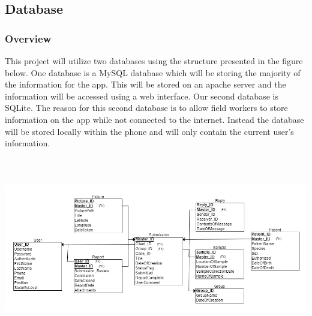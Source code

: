 \documentclass[onecolumn, draftclsnofoot,10pt, compsoc]{IEEEtran}
\begin{document}
\subsection{Database}
\subsubsection{Overview}
This project will utilize two databases using the structure presented in the figure below. One database is a MySQL database which will be storing the majority of the information for the app. This will be stored on an apache server and the information will be accessed using a web interface. Our second database is SQLite. The reason for this second database is to allow field workers to store information on the app while not connected to the internet. Instead the database will be stored locally within the phone and will only contain the current user's information.

\includegraphics[height = 8cm]{ER_diagram.png}
\end{document}
